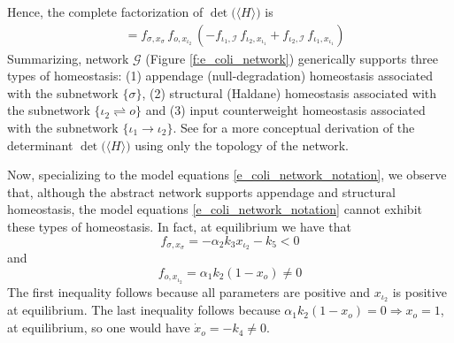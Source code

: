 \documentclass[a4paper,fleqn]{cas-dc}
\begin{document}
Hence, the complete factorization of $\det\!\big(\langle H \rangle \big)$ is
\begin{equation*} \label{analysis_e_coli_part_iii}
\begin{split}
& = f_{\sigma, x_{\sigma}} \, f_{o, x_{\iota_{2}}} \, (-f_{\iota_{1}, \mathcal{I}} \, f_{\iota_{2}, x_{\iota_{1}}} + f_{\iota_{2}, \mathcal{I}} \, f_{\iota_{1}, x_{\iota_{1}}})
\end{split}
\end{equation*}
Summarizing, network $\mathcal{G}$ (Figure \ref{f:e_coli_network}) generically supports three types of homeostasis: (1) appendage (null-degradation) homeostasis associated with the subnetwork $\{\sigma\}$, (2) structural (Haldane) homeostasis associated with the subnetwork $\{\iota_{2} \rightleftharpoons o\}$ and (3) input counterweight homeostasis associated with the subnetwork $\{\iota_{1} \rightarrow \iota_{2}\}$.
See \cite{madeira2022} for a more conceptual derivation of the determinant $\det\!\big(\langle H \rangle \big)$ using only the topology of the network.

Now, specializing to the model equations \eqref{e_coli_network_notation}, we 
observe that, although the abstract network supports appendage and structural homeostasis, the model equations \eqref{e_coli_network_notation} cannot exhibit these types of homeostasis.
In fact, at equilibrium we have that
\begin{equation}
f_{\sigma, x_{\sigma}} = -\alpha_{2}k_{3}x_{\iota_{2}} - k_{5} < 0
\end{equation}
and
\begin{equation}
f_{o, x_{\iota_{2}}} = \alpha_{1}k_{2}(1 - x_{o}) \neq 0
\end{equation}
The first inequality follows because all parameters are positive and $x_{\iota_{2}}$ is positive at equilibrium.
The last inequality follows because $\alpha_{1}k_{2}(1 - x_{o}) = 0 \Rightarrow x_{o} = 1$, at equilibrium, so one would have $\dot{x}_{o} = - k_{4} \neq 0$.
\end{document}
